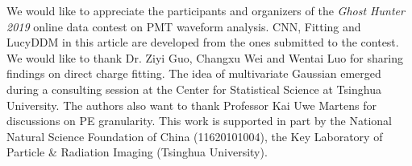 \acknowledgments
We would like to appreciate the participants and organizers of the \textit{Ghost Hunter 2019} online data contest on PMT waveform analysis.  CNN, Fitting and LucyDDM in this article are developed from the ones submitted to the contest.  We would like to thank Dr. Ziyi Guo, Changxu Wei and Wentai Luo for sharing findings on direct charge fitting.  The idea of multivariate Gaussian emerged during a consulting session at the Center for Statistical Science at Tsinghua University.  The authors also want to thank Professor Kai Uwe Martens for discussions on PE granularity.  This work is supported in part by the National Natural Science Foundation of China (11620101004), the Key Laboratory of Particle \& Radiation Imaging (Tsinghua University). 


